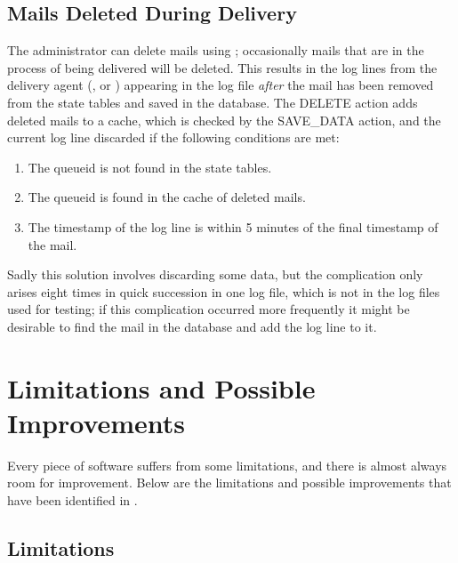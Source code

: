 \subsection{Mails Deleted During Delivery}

\label{Mails deleted during delivery}

The administrator can delete mails using ; occasionally
mails that are in the process of being delivered will be deleted.  This
results in the log lines from the delivery agent (,
 or ) appearing in the log file
\textit{after\/} the mail has been removed from the state tables and saved
in the database.  The DELETE action adds deleted mails to a cache, which is
checked by the SAVE\_DATA action, and the current log line discarded if the
following conditions are met:

\begin{enumerate}

    \item The queueid is not found in the state tables.

    \item The queueid is found in the cache of deleted mails.

    \item The timestamp of the log line is within 5 minutes of the final
        timestamp of the mail.

\end{enumerate}

Sadly this solution involves discarding some data, but the complication
only arises eight times in quick succession in one log file, which is not
in the \numberOFlogFILES{} log files used for testing; if this complication
occurred more frequently it might be desirable to find the mail in the
database and add the log line to it.

\section{Limitations and Possible Improvements}

\label{limitations and improvements in implementation}

Every piece of software suffers from some limitations, and there is almost
always room for improvement.  Below are the limitations and possible
improvements that have been identified in \parsername{}.

\subsection{Limitations}

